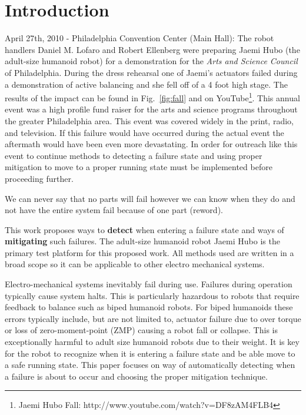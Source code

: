\section{Introduction}

April 27th, 2010 - Philadelphia Convention Center (Main Hall):  The robot handlers Daniel M. Lofaro and Robert Ellenberg were preparing Jaemi Hubo (the adult-size humanoid robot) for a demonstration for the \textit{Arts and Science Council} of Philadelphia.  During the dress rehearsal one of Jaemi's actuators failed during a demonstration of active balancing and she fell off of a 4 foot high stage.  The results of the impact can be found in Fig.~\ref{fig:fall} and on YouTube\footnote{Jaemi Hubo Fall: http://www.youtube.com/watch?v=DF8zAM4FLB4}\label{link:fall}.  This annual event was a high profile fund raiser for the arts and science programs throughout the greater Philadelphia area.  This event was covered widely in the print, radio, and television.  If this failure would have occurred during the actual event the aftermath would have been even more devastating.  In order for outreach like this event to continue methods to detecting a failure state and using proper mitigation to move to a proper running state must be implemented before proceeding further.  

We can never say that no parts will fail however we can know when they do and not have the entire system fail because of one part (reword).

This work proposes ways to \textbf{detect} when entering a failure state and ways of \textbf{mitigating} such failures.  The adult-size humanoid robot Jaemi Hubo is the primary test platform for this proposed work.  All methods used are written in a broad scope so it can be applicable to other electro mechanical systems.




Electro-mechanical systems inevitably fail during use.  Failures during operation typically cause system halts.  This is particularly hazardous to robots that require feedback to balance such as biped humanoid robots.  For biped humanoids these errors typically include, but are not limited to, actuator failure due to over torque or loss of zero-moment-point (ZMP) \cite{zmp35} causing a robot fall or collapse.  This is exceptionally harmful to adult size humanoid robots due to their weight.  It is key for the robot to recognize when it is entering a failure state and be able move to a safe running state.  This paper focuses on way of automatically detecting when a failure is about to occur and choosing the proper mitigation technique.

